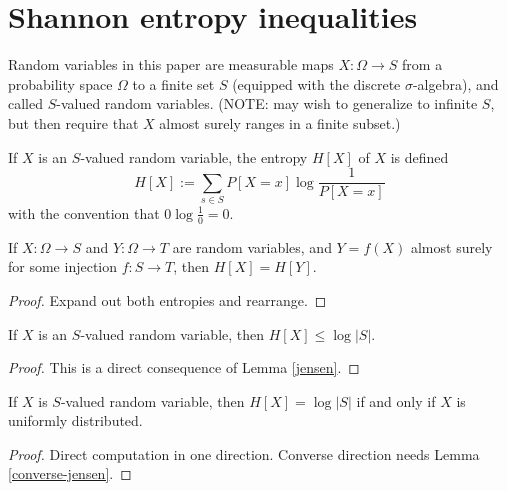 \chapter{Shannon entropy inequalities}

Random variables in this paper are measurable maps $X : \Omega \to S$ from a probability space $\Omega$ to a finite set $S$ (equipped with the discrete $\sigma$-algebra), and called $S$-valued random variables.
(NOTE: may wish to generalize to infinite $S$, but then require that $X$ almost surely ranges in a finite subset.)

\begin{definition}[Entropy]
  \label{entropy-def}
  \leanok
  If $X$ is an $S$-valued random variable, the entropy $H[X]$ of $X$ is defined
  $$ H[X] := \sum_{s \in S} P[X=x] \log \frac{1}{P[X=x]}$$
  with the convention that $0 \log \frac{1}{0} = 0$.
\end{definition}

\begin{lemma}\label{relabeled-entropy} 
  If $X: \Omega \to S$ and $Y: \Omega \to T$ are random variables, and $Y = f(X)$ almost surely for some injection $f: S \to T$, then $H[X] = H[Y]$.
\end{lemma}

\begin{proof} \leanok Expand out both entropies and rearrange.
\end{proof}

\begin{lemma}\label{jensen-bound}
  \leanok
  If $X$ is an $S$-valued random variable, then $H[X] \leq \log |S|$.
\end{lemma}

\begin{proof}\leanok
  This is a direct consequence of Lemma \ref{jensen}.
\end{proof}

\begin{lemma}\label{uniform-entropy}
  If $X$ is $S$-valued random variable, then $H[X] = \log |S|$ if and only if $X$ is uniformly distributed.
\end{lemma}

\begin{proof}  Direct computation in one direction.  Converse direction needs Lemma \ref{converse-jensen}.
\end{proof}

